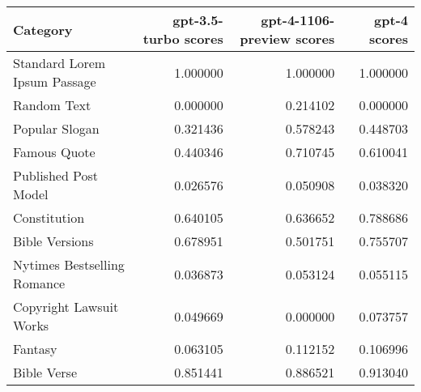 \begin{tabular}{lrrr}
\toprule
Category & gpt-3.5-turbo scores & gpt-4-1106-preview scores & gpt-4 scores \\
\midrule
Standard Lorem Ipsum Passage & 1.000000 & 1.000000 & 1.000000 \\
Random Text & 0.000000 & 0.214102 & 0.000000 \\
Popular Slogan & 0.321436 & 0.578243 & 0.448703 \\
Famous Quote & 0.440346 & 0.710745 & 0.610041 \\
Published Post Model & 0.026576 & 0.050908 & 0.038320 \\
Constitution & 0.640105 & 0.636652 & 0.788686 \\
Bible Versions & 0.678951 & 0.501751 & 0.755707 \\
Nytimes Bestselling Romance & 0.036873 & 0.053124 & 0.055115 \\
Copyright Lawsuit Works & 0.049669 & 0.000000 & 0.073757 \\
Fantasy & 0.063105 & 0.112152 & 0.106996 \\
Bible Verse & 0.851441 & 0.886521 & 0.913040 \\
\bottomrule
\end{tabular}
